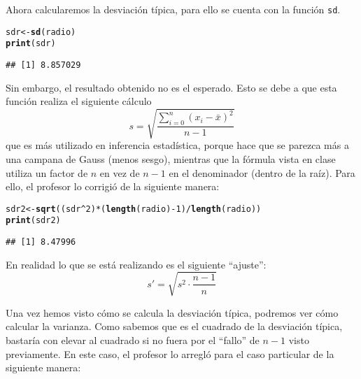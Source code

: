 \documentclass[12pt]{report}\usepackage[]{graphicx}\usepackage[dvipsnames]{xcolor}
\makeatletter
\newcommand{\hlnum}[1]{\textcolor[rgb]{0.686,0.059,0.569}{#1}}%
\newcommand{\hlopt}[1]{\textcolor[rgb]{0,0,0}{#1}}%
\newcommand{\hlstd}[1]{\textcolor[rgb]{0.345,0.345,0.345}{#1}}%
\newcommand{\hlkwb}[1]{\textcolor[rgb]{0.69,0.353,0.396}{#1}}%
\newcommand{\hlkwd}[1]{\textcolor[rgb]{0.737,0.353,0.396}{\textbf{#1}}}%
\newenvironment{kframe}{%
 \def\at@end@of@kframe{}%
 \ifinner\ifhmode%
  \def\at@end@of@kframe{\end{minipage}}%
  \begin{minipage}{\columnwidth}%
 \fi\fi%
 \def\FrameCommand##1{\hskip\@totalleftmargin \hskip-\fboxsep
 \colorbox{shadecolor}{##1}\hskip-\fboxsep
     \hskip-\linewidth \hskip-\@totalleftmargin \hskip\columnwidth}%
 \MakeFramed {\advance\hsize-\width
   \@totalleftmargin\z@ \linewidth\hsize
   \@setminipage}}%
 {\par\unskip\endMakeFramed%
 \at@end@of@kframe}
\newenvironment{knitrout}{}{} %
\makeatother
\begin{document}
			Ahora calcularemos la desviación típica, para ello se cuenta con la función \texttt{sd}. 
			
\begin{knitrout}
\color{fgcolor}\begin{kframe}
\begin{alltt}
\hlstd{sdr} \hlkwb{<-} \hlkwd{sd}\hlstd{(radio)}
\hlkwd{print}\hlstd{(sdr)}
\end{alltt}
\begin{verbatim}
## [1] 8.857029
\end{verbatim}
\end{kframe}
\end{knitrout}
			
			Sin embargo, el resultado obtenido no es el esperado. Esto se debe a que esta función realiza el siguiente cálculo
			$$
			s = \sqrt{\frac{\displaystyle\sum_{i=0}^n (x_i-\bar{x})^2}{n-1}}
			$$
			que es más utilizado en inferencia estadística, porque hace que se parezca más a una campana de Gauss (menos sesgo), mientras que la fórmula vista en clase utiliza un factor de $n$ en vez de $n-1$ en el denominador (dentro de la raíz). Para ello, el profesor lo corrigió de la siguiente manera: 
			
\begin{knitrout}
\color{fgcolor}\begin{kframe}
\begin{alltt}
\hlstd{sdr2} \hlkwb{<-} \hlkwd{sqrt}\hlstd{((sdr}\hlopt{^}\hlnum{2}\hlstd{)}\hlopt{*}\hlstd{(}\hlkwd{length}\hlstd{(radio)}\hlopt{-}\hlnum{1}\hlstd{)}\hlopt{/}\hlkwd{length}\hlstd{(radio))}
\hlkwd{print}\hlstd{(sdr2)}
\end{alltt}
\begin{verbatim}
## [1] 8.47996
\end{verbatim}
\end{kframe}
\end{knitrout}
			
			En realidad lo que se está realizando es el siguiente ``ajuste'': 
			$$
			s' = \sqrt{s^2\cdot\frac{n-1}{n}}
			$$
			
			Una vez hemos visto cómo se calcula la desviación típica, podremos ver cómo calcular la varianza. Como sabemos que es el cuadrado de la desviación típica, bastaría con elevar al cuadrado si no fuera por el ``fallo'' de $n-1$ visto previamente. En este caso, el profesor lo arregló para el caso particular de la siguiente manera: 
			
\end{document}
